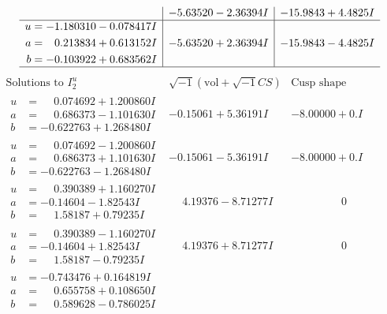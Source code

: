 \documentclass[1p]{elsarticle_modified}
\theoremstyle{definition}
\newcommand{\I}{\sqrt{-1}}
\begin{document}
$$\begin{array}{c|c|c}
 & -5.63520 - 2.36394 I & -15.9843 + 4.4825 I \\ \hline\begin{aligned}
u &= -1.180310 - 0.078417 I \\
a &= \phantom{-}0.213834 + 0.613152 I \\
b &= -0.103922 + 0.683562 I\end{aligned}
 & -5.63520 + 2.36394 I & -15.9843 - 4.4825 I\\
 \hline 
 \end{array}$$\newpage$$\begin{array}{c|c|c}  
\text{Solutions to }I^u_{2}& \I (\text{vol} + \sqrt{-1}CS) & \text{Cusp shape}\\
 \hline 
\begin{aligned}
u &= \phantom{-}0.074692 + 1.200860 I \\
a &= \phantom{-}0.686373 - 1.101630 I \\
b &= -0.622763 + 1.268480 I\end{aligned}
 & -0.15061 + 5.36191 I & -8.00000 + 0. I\phantom{ +0.000000I} \\ \hline\begin{aligned}
u &= \phantom{-}0.074692 - 1.200860 I \\
a &= \phantom{-}0.686373 + 1.101630 I \\
b &= -0.622763 - 1.268480 I\end{aligned}
 & -0.15061 - 5.36191 I & -8.00000 + 0. I\phantom{ +0.000000I} \\ \hline\begin{aligned}
u &= \phantom{-}0.390389 + 1.160270 I \\
a &= -0.14604 - 1.82543 I \\
b &= \phantom{-}1.58187 + 0.79235 I\end{aligned}
 & \phantom{-}4.19376 - 8.71277 I & \phantom{-0.000000 } 0 \\ \hline\begin{aligned}
u &= \phantom{-}0.390389 - 1.160270 I \\
a &= -0.14604 + 1.82543 I \\
b &= \phantom{-}1.58187 - 0.79235 I\end{aligned}
 & \phantom{-}4.19376 + 8.71277 I & \phantom{-0.000000 } 0 \\ \hline\begin{aligned}
u &= -0.743476 + 0.164819 I \\
a &= \phantom{-}0.655758 + 0.108650 I \\
b &= \phantom{-}0.589628 - 0.786025 I\end{aligned}

\end{array}$$
\end{document}
